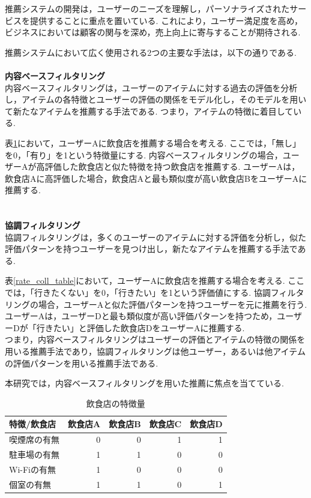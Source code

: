 \documentclass[12pt,a4j]{jreport}
\begin{document}
推薦システムの開発は，ユーザーのニーズを理解し，パーソナライズされたサービスを提供することに重点を置いている.
これにより，ユーザー満足度を高め，ビジネスにおいては顧客の関与を深め，売上向上に寄与することが期待される.

推薦システムにおいて広く使用される2つの主要な手法は，以下の通りである.\\\\
\textbf{内容ベースフィルタリング}\\
内容ベースフィルタリングは，ユーザーのアイテムに対する過去の評価を分析し，アイテムの各特徴とユーザーの評価の関係をモデル化し，そのモデルを用いて新たなアイテムを推薦する手法である.
つまり，アイテムの特徴に着目している.

表\ref{rate_content_table}において，ユーザーAに飲食店を推薦する場合を考える. 
ここでは，「無し」を0，「有り」を1という特徴量にする.
内容ベースフィルタリングの場合，ユーザーAが高評価した飲食店と似た特徴を持つ飲食店を推薦する.
ユーザーAは，飲食店Aに高評価した場合，飲食店Aと最も類似度が高い飲食店BをユーザーAに推薦する.\\\\\\
\textbf{協調フィルタリング}\\
協調フィルタリングは，多くのユーザーのアイテムに対する評価を分析し，似た評価パターンを持つユーザーを見つけ出し，新たなアイテムを推薦する手法である.

表\ref{rate_coll_table}において，ユーザーAに飲食店を推薦する場合を考える.
ここでは，「行きたくない」を0，「行きたい」を1という評価値にする.
協調フィルタリングの場合，ユーザーAと似た評価パターンを持つユーザーを元に推薦を行う.
ユーザーAは，ユーザーDと最も類似度が高い評価パターンを持つため，ユーザーDが「行きたい」と評価した飲食店DをユーザーAに推薦する.\\

つまり，内容ベースフィルタリングはユーザーの評価とアイテムの特徴の関係を用いる推薦手法であり，協調フィルタリングは他ユーザー，あるいは他アイテムの評価パターンを用いる推薦手法である.

本研究では，内容ベースフィルタリングを用いた推薦に焦点を当てている.\\

\begin{table}[htbp]
  \begin{center}
    \begin{tabular}{|l|r|r|r|r|}\hline
      \textbf{特徴/飲食店} & 飲食店A & 飲食店B & 飲食店C & 飲食店D \\ \hline
      喫煙席の有無       & 0        & 0        & 1        & 1 \\ \hline
      駐車場の有無       & 1        & 1        & 0        & 0 \\ \hline
      Wi-Fiの有無       & 1        & 0        & 0        & 0 \\ \hline
      個室の有無         & 1        & 1        & 0        & 1 \\ \hline
    \end{tabular}
  \end{center}
  \caption{飲食店の特徴量}
  \label{rate_content_table}
\end{table}
\end{document}
